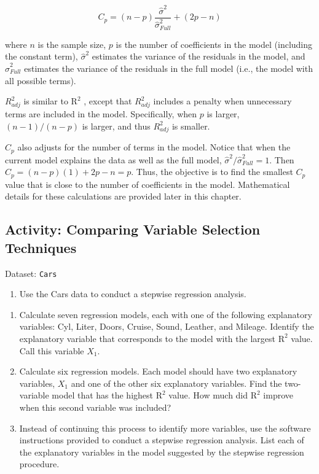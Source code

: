 \documentclass[
]{book}
\providecommand{\tightlist}{%
  \setlength{\itemsep}{0pt}\setlength{\parskip}{0pt}}
\begin{document}
\begin{equation}
\label{Cp}
C_p  = (n-p)\frac{\hat{\sigma}^2}{\hat{\sigma}^2_{Full}} + (2p-n)
\tag{3.4}
\end{equation}

where \(n\) is the sample size, \(p\) is the number of coefficients in the model (including the constant term), \(\hat{\sigma}^2\) estimates the variance of the residuals in the model, and \(\hat{\sigma}^2_{Full}\) estimates the variance of the residuals in the full model (i.e., the model with all possible terms).

\(R^2_{adj}\) is similar to \(\mathrm{R}^2\) , except that \(R^2_{adj}\) includes a penalty when unnecessary terms are included in the model. Specifically, when \(p\) is larger, \((n - 1)/(n - p)\) is larger, and thus \(R^2_{adj}\) is smaller.

\(C_p\) also adjusts for the number of terms in the model. Notice that when the current model explains the data as well as the full model, \(\hat{\sigma}^2 / \hat{\sigma}^2_{Full} = 1\). Then \(C_p = (n - p)(1) + 2p - n = p\). Thus, the objective is to find the smallest
\(C_p\) value that is close to the number of coefficients in the model. Mathematical details for these calculations are provided later in this chapter.

\hypertarget{activity-comparing-variable-selection-techniques}{%
\subsection*{Activity: Comparing Variable Selection Techniques}\label{activity-comparing-variable-selection-techniques}}

Dataset: \texttt{Cars}

\begin{enumerate}
\def\labelenumi{\arabic{enumi}.}
\setcounter{enumi}{3}
\tightlist
\item
  Use the Cars data to conduct a stepwise regression analysis.
\end{enumerate}

\begin{enumerate}
\def\labelenumi{\alph{enumi}.}
\item
  Calculate seven regression models, each with one of the following explanatory variables: Cyl, Liter, Doors, Cruise, Sound, Leather, and Mileage. Identify the explanatory variable that corresponds to the model with the largest \(\mathrm{R}^2\) value. Call this variable \(X_1\).
\item
  Calculate six regression models. Each model should have two explanatory variables, \(X_1\) and one of the other six explanatory variables. Find the two-variable model that has the highest \(\mathrm{R}^2\) value. How much did \(\mathrm{R}^2\) improve when this second variable was included?
\item
  Instead of continuing this process to identify more variables, use the software instructions provided to conduct a stepwise regression analysis. List each of the explanatory variables in the model suggested by the stepwise regression procedure.
\end{enumerate}
\end{document}
